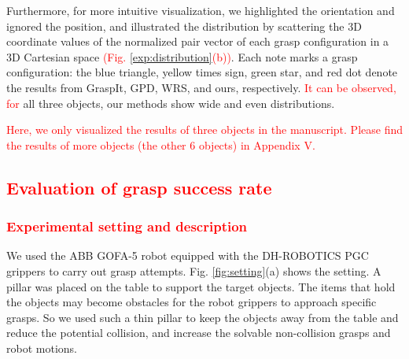 \documentclass[journal]{IEEEtran}
\newcommand{\rev}[1]{\textcolor{red}{#1}}
\newcommand{\hu}[1]{{\color{magenta}\begin{CJK*}{UTF8}{gkai}#1\end{CJK*}}}
\begin{document}
Furthermore, for more intuitive visualization, we highlighted the orientation and ignored the position, and illustrated the distribution by scattering the 3D coordinate values of the normalized pair vector of each grasp configuration in a 3D Cartesian space \rev{(Fig. \ref{exp:distribution}(b))}. Each note marks a grasp configuration: the blue triangle, yellow times sign, green star, and red dot denote the results from GraspIt, GPD, WRS, and ours, respectively. \rev{It can be observed, for} all three objects, our methods show wide and even distributions. 

\rev{Here, we only visualized the results of three objects in the manuscript. Please find the results of more objects (the other 6 objects) in Appendix V.}

\subsection{\rev{Evaluation of grasp success rate}}
\subsubsection{\rev{Experimental setting and description}}
We used the ABB GOFA-5 robot equipped with the DH-ROBOTICS PGC grippers to carry out grasp attempts. Fig. \ref{fig:setting}(a) shows the setting. A pillar was placed on the table to support the target objects. The items that hold the objects may become obstacles for the robot grippers to approach specific grasps. So we used such a thin pillar to keep the objects away from the table and reduce the potential collision, and increase the solvable non-collision grasps and robot motions. 
\end{document}
